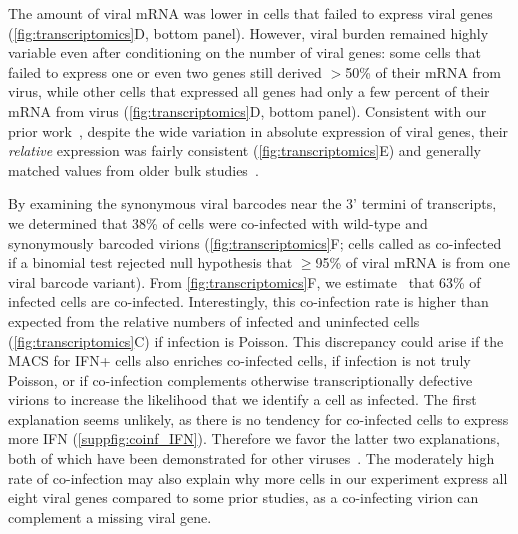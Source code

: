 \documentclass[]{asm-article}
\newcommand{\FIG}[1]{\autoref{fig:#1}}
\newcommand{\SUPPFIG}[1]{\autoref{suppfig:#1}}
\begin{document}
The amount of viral mRNA was lower in cells that failed to express viral genes (\FIG{transcriptomics}D, bottom panel).
However, viral burden remained highly variable even after conditioning on the number of viral genes: some cells that failed to express one or even two genes still derived $>$50\% of their mRNA from virus, while other cells that expressed all genes had only a few percent of their mRNA from virus (\FIG{transcriptomics}D, bottom panel).
Consistent with our prior work~\cite{russell2018extreme}, despite the wide variation in absolute expression of viral genes, their \emph{relative} expression was fairly consistent (\FIG{transcriptomics}E) and generally matched values from older bulk studies~\cite{hatada1989control}.

By examining the synonymous viral barcodes near the 3' termini of transcripts, we determined that 38\% of cells were co-infected with wild-type and synonymously barcoded virions (\FIG{transcriptomics}F; cells called as co-infected if a binomial test rejected null hypothesis that $\ge$95\% of viral mRNA is from one viral barcode variant).
From \FIG{transcriptomics}F, we estimate~\cite{bloom2018estimating} that 63\% of infected cells are co-infected.
Interestingly, this co-infection rate is higher than expected from the relative numbers of infected and uninfected cells (\FIG{transcriptomics}C) if infection is Poisson.
This discrepancy could arise if the MACS for IFN+ cells also enriches co-infected cells, if infection is not truly Poisson, or if co-infection complements otherwise transcriptionally defective virions to increase the likelihood that we identify a cell as infected.
The first explanation seems unlikely, as there is no tendency for co-infected cells to express more IFN (\SUPPFIG{coinf_IFN}). 
Therefore we favor the latter two explanations, both of which have been demonstrated for other viruses~\cite{aguilera2017plaques, combe2015single}.
The moderately high rate of co-infection may also explain why more cells in our experiment express all eight viral genes compared to some prior studies, as a co-infecting virion can complement a missing viral gene. 
\end{document}
